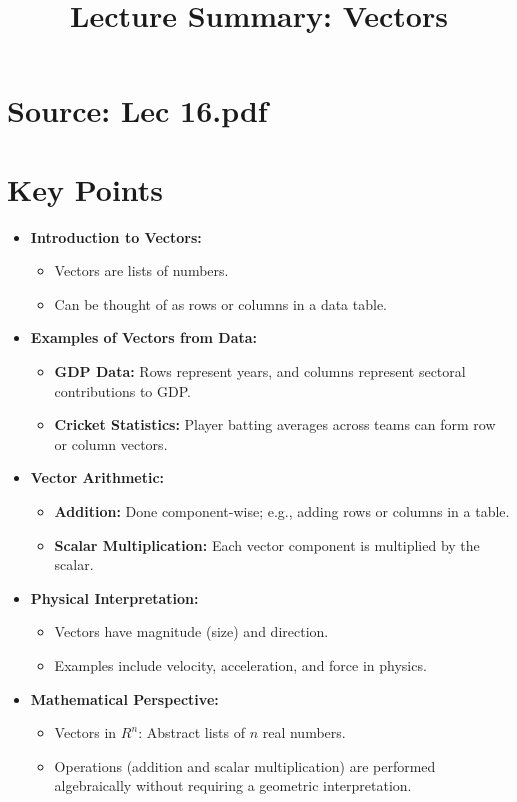 \documentclass{article}
\title{Lecture Summary: Vectors}
\author{}
\date{}
\begin{document}
\maketitle

\section*{Source: Lec 16.pdf}

\section*{Key Points}

\begin{itemize}
  \item \textbf{Introduction to Vectors:}
    \begin{itemize}
      \item Vectors are lists of numbers.
      \item Can be thought of as rows or columns in a data table.
    \end{itemize}

  \item \textbf{Examples of Vectors from Data:}
    \begin{itemize}
      \item \textbf{GDP Data:} Rows represent years, and columns represent sectoral contributions to GDP.
      \item \textbf{Cricket Statistics:} Player batting averages across teams can form row or column vectors.
    \end{itemize}

  \item \textbf{Vector Arithmetic:}
    \begin{itemize}
      \item \textbf{Addition:} Done component-wise; e.g., adding rows or columns in a table.
      \item \textbf{Scalar Multiplication:} Each vector component is multiplied by the scalar.
    \end{itemize}

  \item \textbf{Physical Interpretation:}
    \begin{itemize}
      \item Vectors have magnitude (size) and direction.
      \item Examples include velocity, acceleration, and force in physics.
    \end{itemize}

  \item \textbf{Mathematical Perspective:}
    \begin{itemize}
      \item Vectors in $R^n$: Abstract lists of $n$ real numbers.
      \item Operations (addition and scalar multiplication) are performed algebraically without requiring a geometric interpretation.
    \end{itemize}
\end{itemize}
\end{document}
